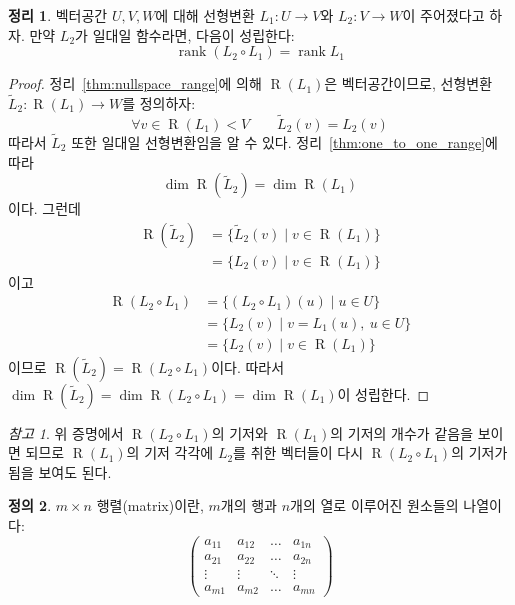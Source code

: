 \documentclass[unfonts,oneside,a4paper]{oblivoir}
\theoremstyle{definition}
\newtheorem{definition}{정의}[section]
\theoremstyle{theorem}
\newtheorem{theorem}[definition]{정리}
\theoremstyle{theorem}
\theoremstyle{remark}
\newtheorem*{remark}{참고}
\theoremstyle{remark}
\theoremstyle{remark}
\theoremstyle{remark}
\renewcommand{\vec}[1]{\bm{\mathit{#1}}}
\DeclareMathOperator{\Range}{R}
\DeclareMathOperator{\rank}{rank}
\begin{document}
\begin{theorem} \label{thm:one_to_one_rank}
    벡터공간 $U, V, W$에 대해 선형변환 $L_1: U \rightarrow V$와 $L_2: V \rightarrow W$이 주어졌다고 하자.
    만약 $L_2$가 일대일 함수라면, 다음이 성립한다:
    \begin{equation*}
        \rank (L_2 \circ L_1) = \rank L_1
    \end{equation*}
\end{theorem}

\begin{proof}
    정리~\ref{thm:nullspace_range}에 의해 $\Range(L_1)$은 벡터공간이므로, 선형변환 $\tilde L_2: \Range(L_1) \rightarrow W$를 정의하자:
    \begin{equation*}
        \forall \vec v \in \Range(L_1) < V \qquad \tilde L_2(\vec v) = L_2(\vec v)
    \end{equation*}
    따라서 $\tilde L_2$ 또한 일대일 선형변환임을 알 수 있다.
    정리~\ref{thm:one_to_one_range}에 따라 
    \begin{equation*}
        \dim \Range(\tilde L_2) = \dim \Range(L_1)
    \end{equation*}
    이다.
    그런데
    \begin{align*}
        \Range(\tilde L_2) &= \{\tilde L_2 (\vec v) \mid \vec v \in \Range(L_1)\}\\
                          &= \{L_2(\vec v) \mid \vec v \in \Range(L_1)\}
    \end{align*}
    이고
    \begin{align*}
        \Range(L_2 \circ L_1) &= \{(L_2 \circ L_1) (\vec u) \mid \vec u \in U\}\\
                        &= \{L_2(\vec v) \mid \vec v = L_1(\vec u),\ \vec u \in U\}\\
                        &= \{L_2(\vec v) \mid \vec v \in \Range(L_1)\}
    \end{align*}
    이므로 $\Range(\tilde L_2) = \Range(L_2 \circ L_1)$이다.
    따라서 $\dim \Range(\tilde L_2) = \dim \Range(L_2 \circ L_1) = \dim \Range(L_1)$이 성립한다.
\end{proof}

\begin{remark}
    위 증명에서 $\Range(L_2 \circ L_1)$의 기저와 $\Range(L_1)$의 기저의 개수가 같음을 보이면 되므로 $\Range(L_1)$의 기저 각각에 $L_2$를 취한 벡터들이 다시 $\Range(L_2 \circ L_1)$의 기저가 됨을 보여도 된다.
\end{remark}

\begin{definition}
    $m \times n$ 행렬(matrix)이란, $m$개의 행과 $n$개의 열로 이루어진 원소들의 나열이다:
    \begin{equation*}
        \begin{pmatrix}
            a_{11} & a_{12} & \dots & a_{1n}\\
            a_{21} & a_{22} & \dots & a_{2n}\\
            \vdots & \vdots & \ddots & \vdots\\
            a_{m1} & a_{m2} & \dots & a_{mn}
        \end{pmatrix}
    \end{equation*}
\end{definition}
\end{document}
